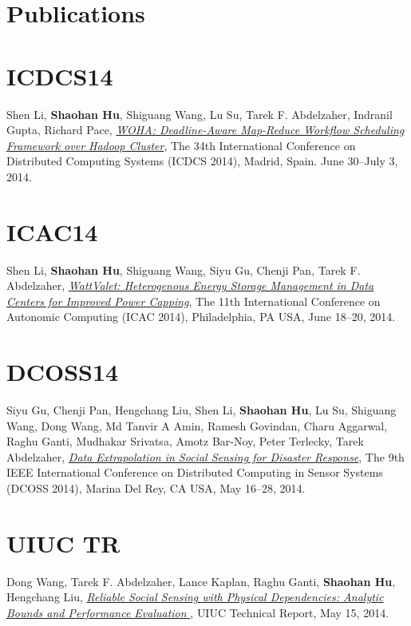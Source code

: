 \section{\sc Publications}

\section{\sc ICDCS14}\hypertarget{li2014icdcs}{}
Shen Li, \textbf{Shaohan Hu}, Shiguang Wang, Lu Su, Tarek F. Abdelzaher, Indranil Gupta, Richard Pace, \href{}{\emph{WOHA: Deadline-Aware Map-Reduce Workflow Scheduling Framework over Hadoop Cluster}}, \textsf{The 34th International Conference on Distributed Computing Systems (ICDCS 2014)}, Madrid, Spain. June 30--July 3, 2014.

\section{\sc ICAC14}\hypertarget{li2014icac}{}
Shen Li, \textbf{Shaohan Hu}, Shiguang Wang, Siyu Gu, Chenji Pan, Tarek F. Abdelzaher, \href{}{\emph{WattValet: Heterogenous Energy Storage Management in Data Centers for Improved Power Capping}}, \textsf{The 11th International Conference on Autonomic Computing (ICAC 2014)}, Philadelphia, PA USA, June 18--20, 2014.

\section{\sc DCOSS14}\hypertarget{gu2014dcoss}{}
Siyu Gu, Chenji Pan, Hengchang Liu, Shen Li, \textbf{Shaohan Hu}, Lu Su, Shiguang Wang, Dong Wang, Md Tanvir A Amin, Ramesh Govindan, Charu Aggarwal, Raghu Ganti, Mudhakar Srivatsa, Amotz Bar-Noy, Peter Terlecky, Tarek Abdelzaher, \href{}{\emph{Data Extrapolation in Social Sensing for Disaster Response}}, \textsf{The 9th IEEE International Conference on Distributed Computing in Sensor Systems (DCOSS 2014)}, Marina Del Rey, CA USA, May 16--28, 2014.

\section{\sc UIUC TR}\hypertarget{wang2014uiuc}{}
Dong Wang, Tarek F. Abdelzaher, Lance Kaplan, Raghu Ganti, \textbf{Shaohan Hu}, Hengchang Liu, \href{https://www.ideals.illinois.edu/handle/2142/49113}{\emph{Reliable Social Sensing with Physical Dependencies: Analytic Bounds and Performance Evaluation
}}, \textsf{UIUC Technical Report}, May 15, 2014.

